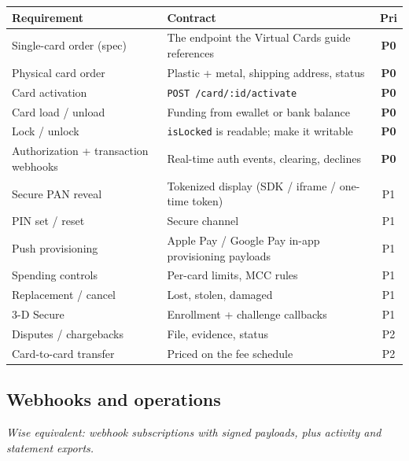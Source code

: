 \documentclass[11pt]{article}
\newcommand{\ep}[1]{\texttt{\small #1}}
\newcommand{\pri}[1]{\textbf{#1}}
\begin{document}
\begin{table}[H]
\centering
\small
\begin{tabular}{@{}p{5.4cm}p{7.2cm}c@{}}
\toprule
\textbf{Requirement} & \textbf{Contract} & \textbf{Pri} \\
\midrule
Single-card order (spec) & The endpoint the Virtual Cards guide references & \pri{P0} \\
Physical card order & Plastic + metal, shipping address, status & \pri{P0} \\
Card activation & \ep{POST /card/:id/activate} & \pri{P0} \\
Card load / unload & Funding from ewallet or bank balance & \pri{P0} \\
Lock / unlock & \ep{isLocked} is readable; make it writable & \pri{P0} \\
Authorization + transaction webhooks & Real-time auth events, clearing, declines & \pri{P0} \\
Secure PAN reveal & Tokenized display (SDK / iframe / one-time token) & P1 \\
PIN set / reset & Secure channel & P1 \\
Push provisioning & Apple Pay / Google Pay in-app provisioning payloads & P1 \\
Spending controls & Per-card limits, MCC rules & P1 \\
Replacement / cancel & Lost, stolen, damaged & P1 \\
3-D Secure & Enrollment + challenge callbacks & P1 \\
Disputes / chargebacks & File, evidence, status & P2 \\
Card-to-card transfer & Priced on the fee schedule & P2 \\
\bottomrule
\end{tabular}
\end{table}

\subsection{Webhooks and operations}\label{sec:ops}

\emph{Wise equivalent: webhook subscriptions with signed payloads, plus activity and statement exports.}
\end{document}
